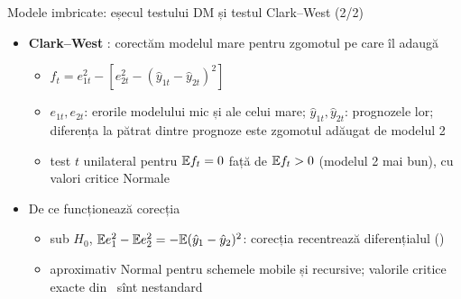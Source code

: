 \begin{frame}{Modele imbricate: eșecul testului DM și testul Clark--West (2/2)}
\itemsize{\small}
\begin{itemize}
    \item \textbf{Clark--West} : corectăm modelul mare pentru zgomotul pe care îl adaugă
    \begin{itemize}
        \item $f_t = e_{1t}^2 - [e_{2t}^2 - (\hat y_{1t} - \hat y_{2t})^2]$
        \item $e_{1t}, e_{2t}$: erorile modelului mic și ale celui mare; $\hat y_{1t}, \hat y_{2t}$: prognozele lor; diferența la pătrat dintre prognoze este zgomotul adăugat de modelul 2
        \item test $t$ unilateral pentru $\mathbb{E} f_t = 0$ față de $\mathbb{E} f_t > 0$ (modelul 2 mai bun), cu valori critice Normale
    \end{itemize}
    \item De ce funcționează corecția
    \begin{itemize}
        \item sub $H_0$, $\mathbb{E} e_1^2 - \mathbb{E} e_2^2 = -\mathbb{E}(\hat y_1 - \hat y_2)^2$: corecția recentrează diferențialul ()
        \item aproximativ Normal pentru schemele mobile și recursive; valorile critice exacte din \ sînt nestandard
    \end{itemize}
\end{itemize}
\end{frame}

